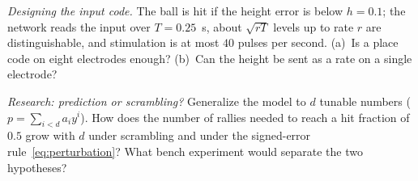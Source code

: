 \begin{exercise}[\lvlB]
\label{ex:22:6}
\emph{Designing the input code.} The ball is hit if the height error is below $h=0.1$; the network reads the input over $T=0.25$~s, about $\sqrt{rT}$ levels up to rate $r$ are distinguishable, and stimulation is at most $40$ pulses per second. (a)~Is a place code on eight electrodes enough? (b)~Can the height be sent as a rate on a single electrode?
\end{exercise}

\begin{exercise}[\lvlC]
\label{ex:22:7}
\emph{Research: prediction or scrambling?} Generalize the model to $d$ tunable numbers ($p=\sum_{i<d}a_iy^i$). How does the number of rallies needed to reach a hit fraction of $0.5$ grow with $d$ under scrambling and under the signed-error rule~\eqref{eq:perturbation}? What bench experiment would separate the two hypotheses?
\end{exercise}
